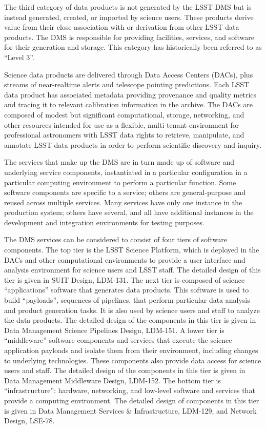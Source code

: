 \documentclass[]{article}
\begin{document}
The third category of data products is not generated by the LSST DMS but
is instead generated, created, or imported by science users. These
products derive value from their close association with or derivation
from other LSST data products. The DMS is responsible for providing
facilities, services, and software for their generation and storage.
This category has historically been referred to as ``Level 3''.

Science data products are delivered through Data Access Centers (DACs),
plus streams of near-realtime alerts and telescope pointing predictions.
Each LSST data product has associated metadata providing provenance and
quality metrics and tracing it to relevant calibration information in
the archive. The DACs are composed of modest but significant
computational, storage, networking, and other resources intended for use
as a flexible, multi-tenant environment for professional astronomers
with LSST data rights to retrieve, manipulate, and annotate LSST data
products in order to perform scientific discovery and inquiry.

The services that make up the DMS are in turn made up of software and
underlying service components, instantiated in a particular
configuration in a particular computing environment to perform a
particular function. Some software components are specific to a service;
others are general-purpose and reused across multiple services. Many
services have only one instance in the production system; others have
several, and all have additional instances in the development and
integration environments for testing purposes.

The DMS services can be considered to consist of four tiers of software
components. The top tier is the LSST Science Platform, which is deployed
in the DACs and other computational environments to provide a user
interface and analysis environment for science users and LSST staff. The
detailed design of this tier is given in SUIT Design, LDM-131. The next
tier is composed of science ``applications'' software that generates
data products. This software is used to build ``payloads'', sequences of
pipelines, that perform particular data analysis and product generation
tasks. It is also used by science users and staff to analyze the data
products. The detailed design of the components in this tier is given in
Data Management Science Pipelines Design, LDM-151. A lower tier is
``middleware'' software components and services that execute the science
application payloads and isolate them from their environment, including
changes to underlying technologies. These components also provide data
access for science users and staff. The detailed design of the
components in this tier is given in Data Management Middleware Design,
LDM-152. The bottom tier is ``infrastructure'': hardware, networking,
and low-level software and services that provide a computing
environment. The detailed design of components in this tier is given in
Data Management Services \& Infrastructure, LDM-129, and Network Design,
LSE-78.
\end{document}
